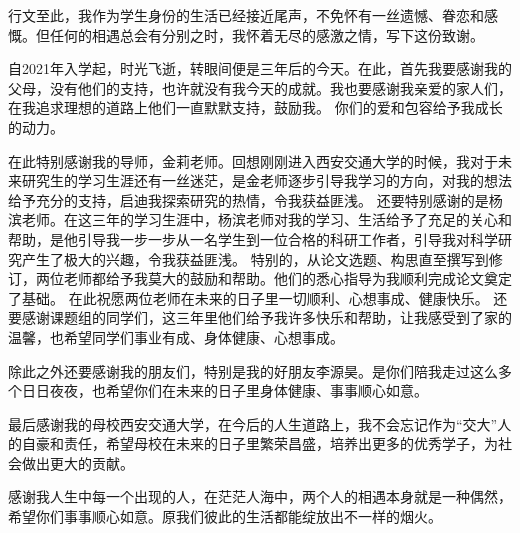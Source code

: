 
行文至此，我作为学生身份的生活已经接近尾声，不免怀有一丝遗憾、眷恋和感慨。但任何的相遇总会有分别之时，我怀着无尽的感激之情，写下这份致谢。

自2021年入学起，时光飞逝，转眼间便是三年后的今天。在此，首先我要感谢我的父母，没有他们的支持，也许就没有我今天的成就。我也要感谢我亲爱的家人们，在我追求理想的道路上他们一直默默支持，鼓励我。
你们的爱和包容给予我成长的动力。

在此特别感谢我的导师，金莉老师。回想刚刚进入西安交通大学的时候，我对于未来研究生的学习生涯还有一丝迷茫，是金老师逐步引导我学习的方向，对我的想法给予充分的支持，启迪我探索研究的热情，令我获益匪浅。
还要特别感谢的是杨滨老师。在这三年的学习生涯中，杨滨老师对我的学习、生活给予了充足的关心和帮助，是他引导我一步一步从一名学生到一位合格的科研工作者，引导我对科学研究产生了极大的兴趣，令我获益匪浅。
特别的，从论文选题、构思直至撰写到修订，两位老师都给予我莫大的鼓励和帮助。他们的悉心指导为我顺利完成论文奠定了基础。
在此祝愿两位老师在未来的日子里一切顺利、心想事成、健康快乐。
还要感谢课题组的同学们，这三年里他们给予我许多快乐和帮助，让我感受到了家的温馨，也希望同学们事业有成、身体健康、心想事成。

除此之外还要感谢我的朋友们，特别是我的好朋友李源昊。是你们陪我走过这么多个日日夜夜，也希望你们在未来的日子里身体健康、事事顺心如意。

最后感谢我的母校西安交通大学，在今后的人生道路上，我不会忘记作为“交大”人的自豪和责任，希望母校在未来的日子里繁荣昌盛，培养出更多的优秀学子，为社会做出更大的贡献。

感谢我人生中每一个出现的人，在茫茫人海中，两个人的相遇本身就是一种偶然，希望你们事事顺心如意。原我们彼此的生活都能绽放出不一样的烟火。